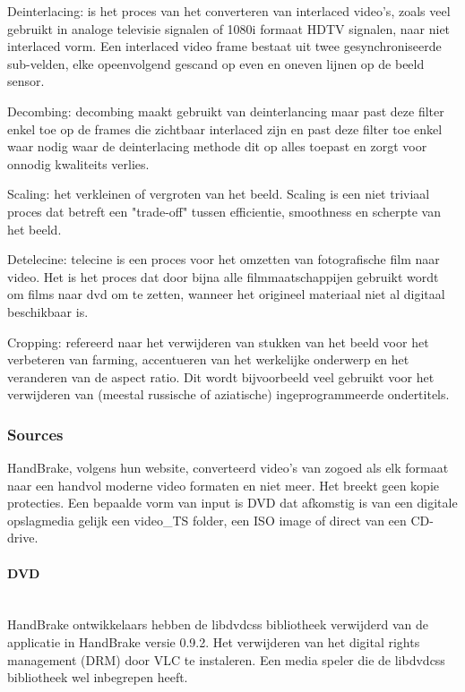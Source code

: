 \begin{list}{*}{}
\item Deinterlacing\cite{Deinterlacing}: is het proces van het converteren van interlaced video's, zoals veel gebruikt in analoge televisie signalen of 1080i formaat HDTV signalen, naar niet interlaced vorm. Een interlaced video frame bestaat uit twee gesynchroniseerde sub-velden, elke opeenvolgend gescand op even en oneven lijnen op de beeld sensor.

\item Decombing\cite{Decomb}: decombing maakt gebruikt van deinterlancing maar past deze filter enkel toe op de frames die zichtbaar interlaced zijn en past deze filter toe enkel waar nodig waar de deinterlacing methode dit op alles toepast en zorgt voor onnodig kwaliteits verlies.

\item Scaling\cite{scaling}: het verkleinen of vergroten van het beeld. Scaling is een niet triviaal proces dat betreft een "trade-off" tussen efficientie, smoothness en scherpte van het beeld.

\item Detelecine\cite{Telecine}: telecine is een proces voor het omzetten van fotografische film naar video. Het is het proces dat door bijna alle filmmaatschappijen gebruikt wordt om films naar dvd om te zetten, wanneer het origineel materiaal niet al digitaal beschikbaar is.

\item Cropping\cite{Cropping}: refereerd naar het verwijderen van stukken van het beeld voor het verbeteren van farming, accentueren van het werkelijke onderwerp en het veranderen van de aspect ratio. Dit wordt bijvoorbeeld veel gebruikt voor het verwijderen van (meestal russische of aziatische) ingeprogrammeerde ondertitels.
\end{list}

\subsubsection{Sources}

HandBrake, volgens hun website, converteerd video's van zogoed als elk formaat naar een handvol moderne video formaten en niet meer. Het breekt geen kopie protecties. Een bepaalde vorm van input is DVD dat afkomstig is van een digitale opslagmedia gelijk een video\_TS folder, een ISO image of direct van een CD-drive.

\paragraph{DVD}
\ \\[12pt]
HandBrake ontwikkelaars hebben de libdvdcss\cite{Libdvdcss} bibliotheek verwijderd van de applicatie in HandBrake versie 0.9.2. Het verwijderen van het digital rights management (DRM)\cite{DRM} door VLC\cite{VLC} te instaleren. Een media speler die de libdvdcss bibliotheek wel inbegrepen heeft.

